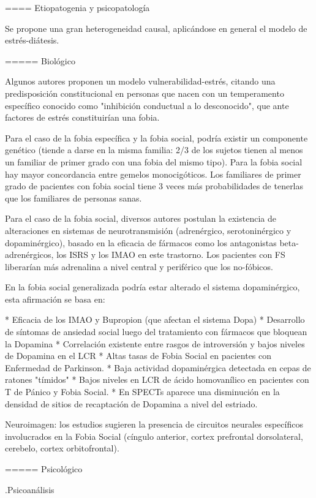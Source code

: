 \begin{itemize}
==== Etiopatogenia y psicopatología

Se propone una gran heterogeneidad causal, aplicándose en general el modelo de estrés-diátesis.

===== Biológico

Algunos autores proponen un modelo vulnerabilidad-estrés, citando una predisposición constitucional en personas que nacen con un temperamento específico conocido como "inhibición conductual a lo desconocido", que ante factores de estrés constituirían una fobia.

Para el caso de la fobia específica y la fobia social, podría existir un componente genético (tiende a darse en la misma familia: 2/3 de los sujetos tienen al menos un familiar de primer grado con una fobia del mismo tipo). Para la fobia social hay mayor concordancia entre gemelos monocigóticos. Los familiares de primer grado de pacientes con fobia social tiene 3 veces más probabilidades de tenerlas que los familiares de personas sanas.

Para el caso de la fobia social, diversos autores postulan la existencia de alteraciones en sistemas de neurotransmisión (adrenérgico, serotoninérgico y dopaminérgico), basado en la eficacia de fármacos como los antagonistas beta-adrenérgicos, los ISRS y los IMAO en este trastorno. Los pacientes con FS liberarían más adrenalina a nivel central y periférico que los no-fóbicos.

En la fobia social generalizada podría estar alterado el sistema dopaminérgico, esta afirmación se basa en:

* Eficacia de los IMAO y Bupropion (que afectan el sistema Dopa)
* Desarrollo de síntomas de ansiedad social luego del tratamiento con fármacos que bloquean la Dopamina
* Correlación existente entre rasgos de introversión y bajos niveles de Dopamina en el LCR
* Altas tasas de Fobia Social en pacientes con Enfermedad de Parkinson.
* Baja actividad dopaminérgica detectada en cepas de ratones "tímidos"
* Bajos niveles en LCR de ácido homovanílico en pacientes con T de Pánico y Fobia Social.
* En SPECTs aparece una disminución en la densidad de sitios de recaptación de Dopamina a nivel del estriado.

Neuroimagen: los estudios sugieren la presencia de circuitos neurales específicos involucrados en la Fobia Social (cíngulo anterior, cortex prefrontal dorsolateral, cerebelo, cortex orbitofrontal).

===== Psicológico

.Psicoanálisis


\end{itemize}
